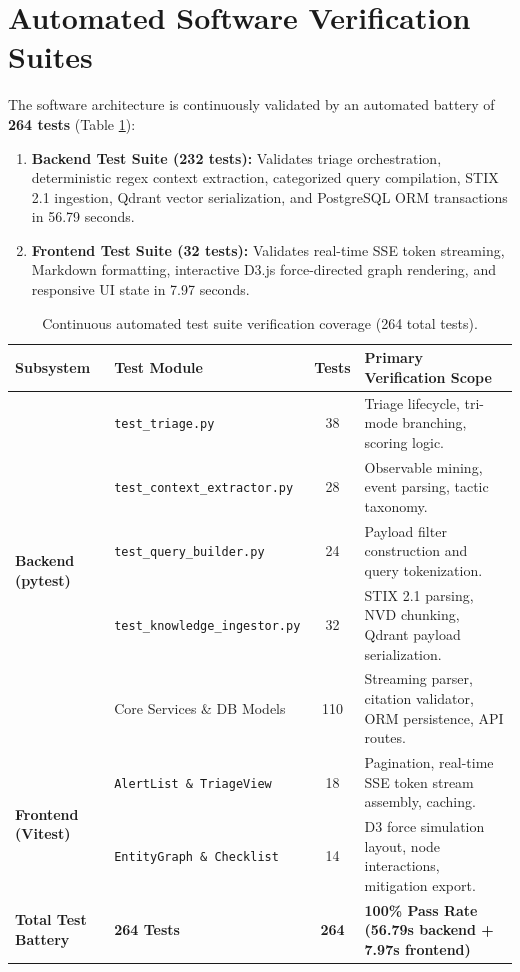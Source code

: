 \section{Automated Software Verification Suites}
\label{sec:backend_test_suite}
The software architecture is continuously validated by an automated battery of \textbf{264 tests} (Table \ref{tab:automated_test_distribution}):
\begin{enumerate}[itemsep=1pt,topsep=2pt]
    \item \textbf{Backend Test Suite (232 tests):} Validates triage orchestration, deterministic regex context extraction, categorized query compilation, STIX 2.1 ingestion, Qdrant vector serialization, and PostgreSQL ORM transactions in 56.79 seconds.
    \item \textbf{Frontend Test Suite (32 tests):} Validates real-time SSE token streaming, Markdown formatting, interactive D3.js force-directed graph rendering, and responsive UI state in 7.97 seconds.
\end{enumerate}

\begin{table}[!htbp]
\centering
\caption{Continuous automated test suite verification coverage (264 total tests).}
\label{tab:automated_test_distribution}
\small
\begin{tabularx}{\textwidth}{@{}l l c X@{}}
\toprule
\textbf{Subsystem} & \textbf{Test Module} & \textbf{Tests} & \textbf{Primary Verification Scope} \\
\midrule
\multirow{5}{*}{\textbf{Backend (pytest)}}
    & \texttt{test\_triage.py} & 38 & Triage lifecycle, tri-mode branching, scoring logic. \\
    & \texttt{test\_context\_extractor.py} & 28 & Observable mining, event parsing, tactic taxonomy. \\
    & \texttt{test\_query\_builder.py} & 24 & Payload filter construction and query tokenization. \\
    & \texttt{test\_knowledge\_ingestor.py} & 32 & STIX 2.1 parsing, NVD chunking, Qdrant payload serialization. \\
    & Core Services \& DB Models & 110 & Streaming parser, citation validator, ORM persistence, API routes. \\
\midrule
\multirow{2}{*}{\textbf{Frontend (Vitest)}}
    & \texttt{AlertList \& TriageView} & 18 & Pagination, real-time SSE token stream assembly, caching. \\
    & \texttt{EntityGraph \& Checklist} & 14 & D3 force simulation layout, node interactions, mitigation export. \\
\midrule
\textbf{Total Test Battery} & \textbf{264 Tests} & \textbf{264} & \textbf{100\% Pass Rate (56.79s backend + 7.97s frontend)} \\
\bottomrule
\end{tabularx}
\end{table}

